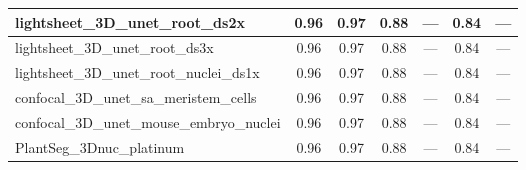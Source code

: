 \documentclass[./dissertation.tex]{subfiles}
\begin{document}
\begin{table}[!ht]
\begin{tabular}{|l|c|c|c|c|c|c|}
    lightsheet\_3D\_unet\_root\_ds2x          & 0.96                                    & 0.97                                        & 0.88                                    & ---                                   & 0.84                                   & ---                                     \\ \hline
    lightsheet\_3D\_unet\_root\_ds3x          & 0.96                                    & 0.97                                        & 0.88                                    & ---                                   & 0.84                                   & ---                                     \\ \hline
    lightsheet\_3D\_unet\_root\_nuclei\_ds1x  & 0.96                                    & 0.97                                        & 0.88                                    & ---                                   & 0.84                                   & ---                                     \\ \hline
    confocal\_3D\_unet\_sa\_meristem\_cells   & 0.96                                    & 0.97                                        & 0.88                                    & ---                                   & 0.84                                   & ---                                     \\ \hline
    confocal\_3D\_unet\_mouse\_embryo\_nuclei & 0.96                                    & 0.97                                        & 0.88                                    & ---                                   & 0.84                                   & ---                                     \\ \hline
    PlantSeg\_3Dnuc\_platinum                 & 0.96                                    & 0.97                                        & 0.88                                    & ---                                   & 0.84                                   & ---                                     \\ \hline
  \end{tabular}
\end{table}
\end{document}
